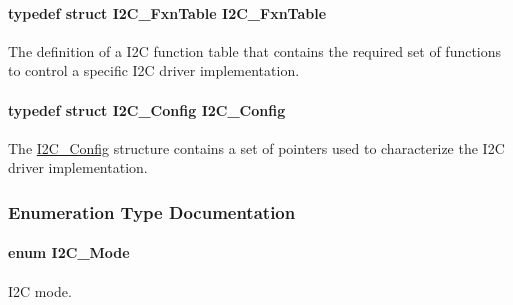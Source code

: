 \paragraph[{I2\-C\-\_\-\-Fxn\-Table}]{\setlength{\rightskip}{0pt plus 5cm}typedef struct {\bf I2\-C\-\_\-\-Fxn\-Table}  {\bf I2\-C\-\_\-\-Fxn\-Table}}\label{_i2_c_8h_abdc2b5945fac9724271b088437881d68}


The definition of a I2\-C function table that contains the required set of functions to control a specific I2\-C driver implementation. 

\paragraph[{I2\-C\-\_\-\-Config}]{\setlength{\rightskip}{0pt plus 5cm}typedef struct {\bf I2\-C\-\_\-\-Config}  {\bf I2\-C\-\_\-\-Config}}\label{_i2_c_8h_a06eeddd0e8a5dd24a18566b65099d588}


The \hyperlink{struct_i2_c___config}{I2\-C\-\_\-\-Config} structure contains a set of pointers used to characterize the I2\-C driver implementation. 



\subsubsection{Enumeration Type Documentation}
\paragraph[{I2\-C\-\_\-\-Mode}]{\setlength{\rightskip}{0pt plus 5cm}enum {\bf I2\-C\-\_\-\-Mode}}\label{_i2_c_8h_ac8f0941a68f18f5d1743a21ab32c7929}


I2\-C mode. 

